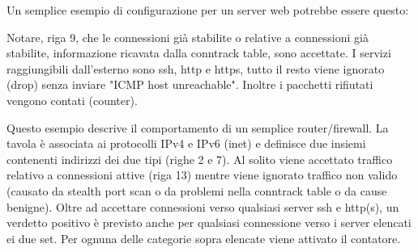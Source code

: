 \noindent Un semplice esempio di configurazione per un server web potrebbe essere
questo:



\noindent Notare, riga 9, che le connessioni già stabilite o relative a
connessioni già stabilite, informazione ricavata dalla conntrack table,
sono accettate.
I servizi raggiungibili dall'esterno sono ssh, http e https, tutto il resto
viene ignorato (drop) senza inviare "ICMP host unreachable". Inoltre i
pacchetti rifiutati vengono contati (counter).

\begin{minipage}{\linewidth}

\end{minipage}

\noindent Questo esempio descrive il comportamento di un semplice
router/firewall. La tavola è associata ai protocolli IPv4 e IPv6 (inet) e
definisce due insiemi contenenti indirizzi dei due tipi (righe 2 e 7).
Al solito viene accettato traffico relativo a connessioni attive (riga 13)
mentre viene ignorato traffico non valido (causato da stealth port scan o da
problemi nella conntrack table o da cause benigne).
Oltre ad accettare connessioni verso qualsiasi server ssh e http(s), un
verdetto positivo è previsto anche per qualsiasi connessione verso i server
elencati ei due set.
Per ognuna delle categorie sopra elencate viene attivato il contatore.


\chapter{}
